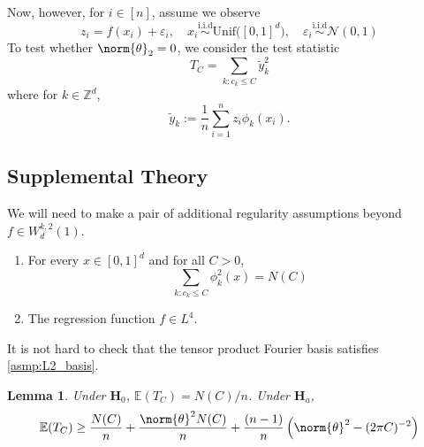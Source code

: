 \documentclass{article}
\newcommand{\1}{\mathbb{I}}
\newcommand{\Ebb}{\mathbb{E}}
\theoremstyle{alden}
\theoremstyle{aldenthm}
\newtheorem{lemma}{Lemma}
\theoremstyle{definition}
\theoremstyle{remark}
\begin{document}
Now, however, for $i \in [n]$, assume we observe
\begin{equation*}
z_i = f(x_i) + \varepsilon_i,\quad x_i \overset{\mathrm{i.i.d}}{\sim} \mathrm{Unif}\bigl([0,1]^d\bigr), \quad \varepsilon_i \overset{\mathrm{i.i.d}}{\sim} \mathcal{N}(0,1)
\end{equation*}
To test whether $\norm{\theta}_2 = 0$, we consider the test statistic
\begin{equation*}
T_C = \sum_{k: c_k \leq C} \widetilde{y}_k^2
\end{equation*}
where for $k \in \mathbb{Z}^d$,
\begin{equation*}
\widetilde{y}_k := \frac{1}{n} \sum_{i = 1}^{n} z_i \phi_k(x_i).
\end{equation*}

\subsection{Supplemental Theory}
We will need to make a pair of additional regularity assumptions beyond $f \in W^{k,2}_d(1)$. 
\begin{enumerate}[label = (A\arabic*)]
	\item 
	\label{asmp:L2_basis}
	For every $x \in [0,1]^d$ and for all $C > 0$,
	\begin{equation*}
	\sum_{k: c_k \leq C} \phi_k^2(x) = N(C)
	\end{equation*}
	\item 
	\label{asmp:L4_regression_function} The regression function $f \in L^4$.
\end{enumerate}
It is not hard to check that the tensor product Fourier basis satisfies \ref{asmp:L2_basis}.
\begin{lemma}
	Under $\mathbf{H}_0$, $\Ebb(T_C) = N(C)/n$. Under $\mathbf{H}_a$, 
	\begin{equation*}
	\Ebb(T_C) \geq \frac{N(C)}{n} + \frac{\norm{\theta}^2N(C)}{n} + \frac{(n-1)}{n}\left(\norm{\theta}^2 - (2\pi C)^{-2}\right)
	\end{equation*}
\end{lemma}
\end{document}

